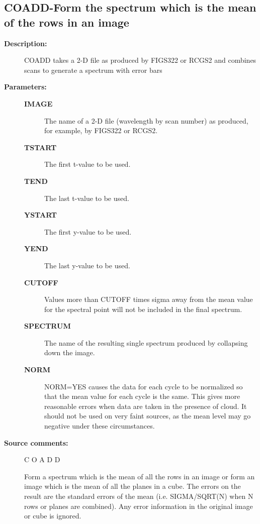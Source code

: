 \subsection{COADD-\label{COADD}Form the spectrum which is the mean of the rows in an image}
\begin{description}

\item [\textbf{Description:}]
 COADD takes a 2-D file as produced by FIGS322 or RCGS2 and combines
 scans to generate a spectrum with error bars

\item [\textbf{Parameters:}]
\begin{description}
\item [\textbf{IMAGE}]
 The name of a 2-D file (wavelength by scan number) as
 produced, for example, by FIGS322 or RCGS2.
\item [\textbf{TSTART}]
 The first t-value to be used.
\item [\textbf{TEND}]
 The last t-value to be used.
\item [\textbf{YSTART}]
 The first y-value to be used.
\item [\textbf{YEND}]
 The last y-value to be used.
\item [\textbf{CUTOFF}]
 Values more than CUTOFF times sigma away from the mean
 value for the spectral point will not be included in
 the final spectrum.
\item [\textbf{SPECTRUM}]
 The name of the resulting single spectrum produced
 by collapsing down the image.
\item [\textbf{NORM}]
 NORM=YES causes the data for each cycle to be
 normalized so that the mean value for each cycle
 is the same. This gives more reasonable errors when
 data are taken in the presence of cloud. It should
 not be used on very faint sources, as the mean level
 may go negative under these circumstances.
\end{description}

\item [\textbf{Source comments:}]
\begin{terminalv}
 C O A D D

 Form a spectrum which is the mean of all the rows in an image
 or form an image which is the mean of all the planes in a cube.
 The errors on the result are the standard errors of the mean
 (i.e. SIGMA/SQRT(N) when N rows or planes are combined). Any error
 information in the original image or cube is ignored.


\end{terminalv}
\end{description}
